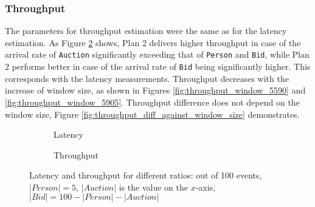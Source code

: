 \subsubsection{Throughput}

The parameters for throughput estimation were the same as for the latency estimation. As Figure \ref{fig:throughput_ratio} shows, Plan 2 delivers higher throughput in case of the arrival rate of \texttt{Auction} significantly exceeding that of \texttt{Person} and \texttt{Bid}, while Plan 2 performs better in case of the arrival rate of \texttt{Bid} being significantly higher. This corresponds with the latency measurements. Throughput decreases with the increase of window size, as shown in Figures \ref{fig:throughput_window_5590} and \ref{fig:throughput_window_5905}. Throughput difference does not depend on the window size, Figure \ref{fig:throughput_diff_against_window_size} demonstrates.

\begin{figure*}[t!]
    \begin{subfigure}[b]{0.43\textwidth}
            
            \captionsetup{justification=justified}
            \caption{Latency}
            \label{fig:latency_ratio}
    \end{subfigure}
    \hspace{5mm}
    \begin{subfigure}[b]{0.43\textwidth}
            
            \captionsetup{justification=justified}
            \caption{Throughput}
            \label{fig:throughput_ratio}
    \end{subfigure}
    \caption{Latency and throughput for different ratios: out of 100 events, $|Person| = 5$, $|Auction|$ is the value on the $x$-axis, $|Bid| = 100 - |Person| - |Auction|$}
    \label{fig:ratio_plots}
\end{figure*}

